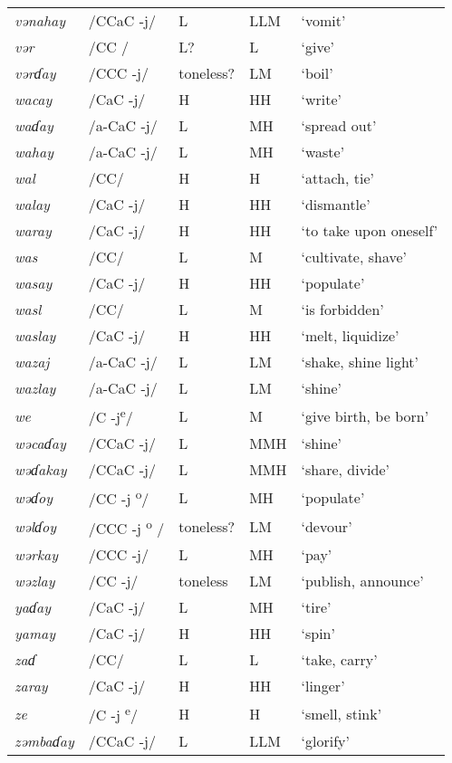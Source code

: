 \begin{small}
\begin{longtable}{lp{1.75cm}p{1.75cm}p{1.75cm}p{3cm}}
\textit{vənahay} & /CCaC -j/ & L & LLM & ‘vomit’\\
\textit{vər} & /CC / & L? & L & ‘give’\\
\textit{vərɗay} & /CCC -j/ & toneless? & LM & ‘boil’\\
\textit{wacay} & /CaC -j/ & H & HH & ‘write’\\
\textit{waɗay} & /a-CaC -j/ & L & MH & ‘spread out’\\
\textit{wahay} & /a-CaC -j/ & L & MH & ‘waste’\\
\textit{wal} & /CC/ & H & H & ‘attach, tie’\\
\textit{walay} & /CaC -j/ & H & HH & ‘dismantle’\\
\textit{waray} & /CaC -j/ & H & HH & ‘to take upon oneself’\\
\textit{was} & /CC/ & L & M & ‘cultivate, shave’\\
\textit{wasay} & /CaC -j/ & H & HH & ‘populate’\\
\textit{wasl} & /CC/ & L & M & ‘is forbidden’\\
\textit{waslay} & /CaC -j/ & H & HH & ‘melt, liquidize’\\
\textit{wazaj} & /a-CaC -j/ & L & LM & ‘shake, shine light’\\
\textit{wazlay} & /a-CaC -j/ & L & LM & ‘shine’\\
\textit{we} & /C {}-j\textsuperscript{e}/ & L & M & ‘give birth, be born’\\
\textit{wəcaɗay} & /CCaC -j/ & L & MMH & ‘shine’\\
\textit{wəɗakay} & /CCaC -j/ & L & MMH & ‘share, divide’\\
\textit{wəɗoy} & /CC -j\textsuperscript{ o}/ & L & MH & ‘populate’\\
\textit{wəlɗoy} & /CCC -j\textsuperscript{ o} / & toneless? & LM & ‘devour’\\
\textit{wərkay} & /CCC -j/ & L & MH & ‘pay’\\
\textit{wəzlay} & /CC -j/ & toneless & LM & ‘publish, announce’\\
\textit{yaɗay} & /CaC -j/ & L & MH & ‘tire’\\
\textit{yamay} & /CaC -j/ & H & HH & ‘spin’\\
\textit{zaɗ} & /CC/ & L & L & ‘take, carry’\\
\textit{zaray} & /CaC -j/ & H & HH & ‘linger’\\
\textit{ze} & /C -j \textsuperscript{e}/ & H & H & ‘smell, stink’\\
\textit{zəmbaɗay} & /CCaC -j/ & L & LLM & ‘glorify’\\

\end{longtable}
\end{small}
